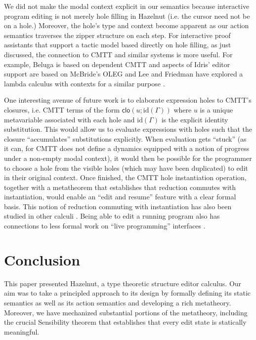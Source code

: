 \documentclass[9pt]{sigplanconf}
\begin{document}
We did not make the modal context explicit in our semantics because interactive program editing is not
merely hole filling in Hazelnut (i.e. the cursor need not be on a
hole.) Moreover, the hole's type and context become apparent as our action
semantics traverses the zipper structure on each step. For interactive
proof assistants that support a tactic model based directly on hole
filling, as just discussed, the connection to CMTT and similar systems is more useful. For
example, Beluga \cite{DBLP:conf/flops/Pientka10} is based on dependent CMTT
and aspects of Idris' editor support \cite{brady2013idris} are based on
McBride's OLEG \cite{mcbride2000dependently} and Lee and Friedman have
explored a lambda calculus with contexts for a similar
purpose \cite{DBLP:conf/icfp/LeeF96}.

One interesting avenue of future work is to elaborate expression holes to
CMTT's closures, i.e. CMTT terms of the form
$\mathsf{clo}(u; \text{id}(\Gamma))$ where $u$ is a unique metavariable
associated with each hole and $\text{id}(\Gamma)$ is the explicit identity
substitution. This would allow us to evaluate expressions with holes such
that the closure ``accumulates'' substitutions explicitly. When evaluation
gets ``stuck'' (as it can, for CMTT does not define a dynamics equipped
with a notion of progress under a non-empty modal context), it would then
be possible for the programmer to choose a hole from the visible
holes (which may have been duplicated) to edit in their original
context. Once finished, the CMTT hole instantiation operation, together
with a metatheorem that establishes that reduction commutes with
instantiation, would enable an ``edit and resume'' feature with a clear
formal basis. This notion of reduction commuting with instantiation has
also been studied in other
calculi \cite{DBLP:journals/entcs/Sands97}. Being able to edit a running
program also has connections to less formal work on ``live programming''
interfaces \cite{burckhardt2013s,lamdu}.

\section{Conclusion}
\label{sec:future}
This paper presented Hazelnut, a type theoretic structure editor
calculus. Our aim was to take a principled approach to its design by
formally defining its static semantics as well as its action semantics and
developing a rich metatheory. Moreover, we have mechanized substantial
portions of the metatheory, including the crucial Sensibility theorem that
establishes that every edit state is statically meaningful.
\end{document}
